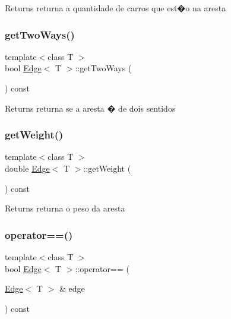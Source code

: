 \begin{DoxyReturn}{Returns}
returna a quantidade de carros que est�o na aresta 
\end{DoxyReturn}
\mbox{\label{class_edge_a1c0292bb11664877045b0c679c1eb0db}} 
\subsubsection{\texorpdfstring{get\+Two\+Ways()}{getTwoWays()}}
{\footnotesize\ttfamily template$<$class T $>$ \\
bool \mbox{\hyperlink{class_edge}{Edge}}$<$ T $>$\+::get\+Two\+Ways (\begin{DoxyParamCaption}{ }\end{DoxyParamCaption}) const}

\begin{DoxyReturn}{Returns}
returna se a aresta � de dois sentidos 
\end{DoxyReturn}
\mbox{\label{class_edge_a3df378e283d6c8be5be4170ac8d7f4e8}} 
\subsubsection{\texorpdfstring{get\+Weight()}{getWeight()}}
{\footnotesize\ttfamily template$<$class T $>$ \\
double \mbox{\hyperlink{class_edge}{Edge}}$<$ T $>$\+::get\+Weight (\begin{DoxyParamCaption}{ }\end{DoxyParamCaption}) const}

\begin{DoxyReturn}{Returns}
returna o peso da aresta 
\end{DoxyReturn}
\mbox{\label{class_edge_a419d424a457e1689cc8a2ec1abf39efa}} 
\subsubsection{\texorpdfstring{operator==()}{operator==()}}
{\footnotesize\ttfamily template$<$class T $>$ \\
bool \mbox{\hyperlink{class_edge}{Edge}}$<$ T $>$\+::operator== (\begin{DoxyParamCaption}\item[{\mbox{\hyperlink{class_edge}{Edge}}$<$ T $>$ \&}]{edge }\end{DoxyParamCaption}) const}

